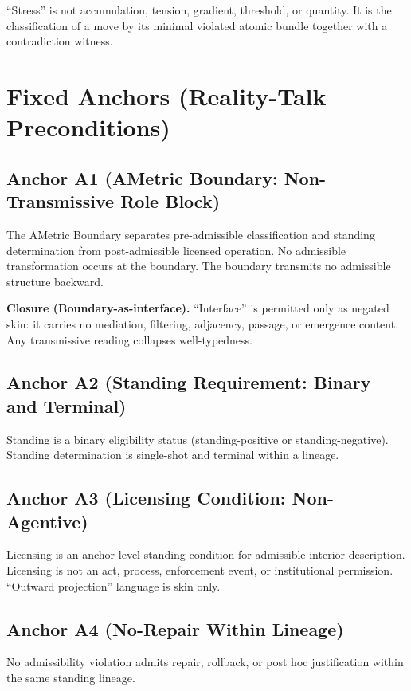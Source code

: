 \documentclass[12pt]{article}
\theoremstyle{plain}
\begin{document}
``Stress'' is not accumulation, tension, gradient, threshold, or quantity. It is the classification of a move by its minimal violated atomic bundle together with a contradiction witness.

\section{Fixed Anchors (Reality-Talk Preconditions)}

\subsection{Anchor A1 (AMetric Boundary: Non-Transmissive Role Block)}

The AMetric Boundary separates pre-admissible classification and standing determination from post-admissible licensed operation. No admissible transformation occurs at the boundary. The boundary transmits no admissible structure backward.

\textbf{Closure (Boundary-as-interface).} ``Interface'' is permitted only as negated skin: it carries no mediation, filtering, adjacency, passage, or emergence content. Any transmissive reading collapses well-typedness.

\subsection{Anchor A2 (Standing Requirement: Binary and Terminal)}

Standing is a binary eligibility status (standing-positive or standing-negative). Standing determination is single-shot and terminal within a lineage.

\subsection{Anchor A3 (Licensing Condition: Non-Agentive)}

Licensing is an anchor-level standing condition for admissible interior description. Licensing is not an act, process, enforcement event, or institutional permission. ``Outward projection'' language is skin only.

\subsection{Anchor A4 (No-Repair Within Lineage)}

No admissibility violation admits repair, rollback, or post hoc justification within the same standing lineage.
\end{document}
